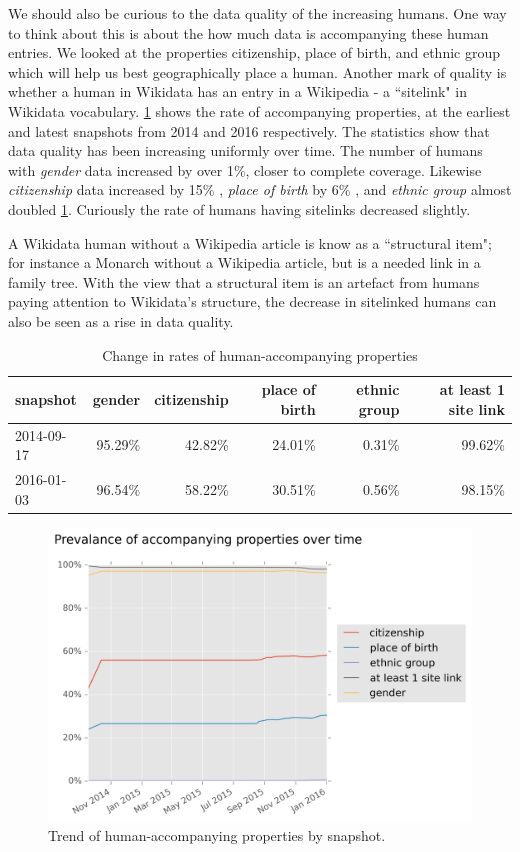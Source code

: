 \documentclass[letterpaper]{article}
\begin{document}
We should also be curious to the data quality of the increasing humans. One way to think about this is about the how much data is accompanying these human entries. We looked at the properties citizenship, place of birth, and ethnic group which will help us best geographically place a human. Another mark of quality is whether a human in Wikidata has an entry in a Wikipedia - a ``sitelink" in Wikidata vocabulary. \ref{fig:accompanying} shows the rate of accompanying properties, at the earliest and latest snapshots from 2014 and 2016 respectively. The statistics show that data quality has been increasing uniformly over time. The number of humans with \textit{gender} data increased by over 1\%, closer to complete coverage. Likewise \textit{citizenship} data increased by 15\% , \textit{place of birth} by 6\%  , and \textit{ethnic group} almost doubled \ref{table:accompanying}. Curiously the rate of humans having sitelinks decreased slightly. 

A Wikidata human without a Wikipedia article is know as a ``structural item"; for instance a Monarch without a Wikipedia article, but is a needed link in a family tree. With the view that a structural item is an artefact from humans paying attention to Wikidata's structure, the decrease in sitelinked humans can also be seen as a rise in data quality.

\begin{table}
\caption{Change in rates of human-accompanying properties}
\begin{tabular}{lrrrrr}
\toprule
snapshot &  gender &  citizenship &  place of birth &  ethnic group &  at least 1 site link \\
\midrule
2014-09-17 &  95.29\% &       42.82\% &          24.01\% &         0.31\% &                99.62\% \\
2016-01-03 &  96.54\% &       58.22\% &          30.51\% &         0.56\% &                98.15\% \\
\bottomrule
\end{tabular}

\label{table:accompanying}
\end{table}

\begin{figure}
\label{fig:accompanying}
\includegraphics[scale=0.6]{figures/additionalprops.png} 
\caption{Trend of human-accompanying properties by snapshot.}
\end{figure}
\end{document}
